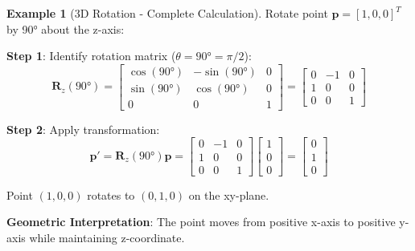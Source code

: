 \documentclass[12pt,a4paper]{article}
\theoremstyle{definition}
\newtheorem{example}{Example}[section]
\begin{document}
\begin{example}[3D Rotation - Complete Calculation]
Rotate point $\mathbf{p} = [1, 0, 0]^T$ by 90° about the z-axis:

\textbf{Step 1}: Identify rotation matrix ($\theta = 90° = \pi/2$):
\[
\mathbf{R}_z(90°) = \begin{bmatrix}
\cos(90°) & -\sin(90°) & 0 \\
\sin(90°) & \cos(90°) & 0 \\
0 & 0 & 1
\end{bmatrix}
= \begin{bmatrix}
0 & -1 & 0 \\
1 & 0 & 0 \\
0 & 0 & 1
\end{bmatrix}
\]

\textbf{Step 2}: Apply transformation:
\[
\mathbf{p}' = \mathbf{R}_z(90°)\mathbf{p} = \begin{bmatrix}
0 & -1 & 0 \\
1 & 0 & 0 \\
0 & 0 & 1
\end{bmatrix}
\begin{bmatrix}
1 \\ 0 \\ 0
\end{bmatrix}
= \begin{bmatrix}
0 \\ 1 \\ 0
\end{bmatrix}
\]

Point $(1, 0, 0)$ rotates to $(0, 1, 0)$ on the xy-plane.

\textbf{Geometric Interpretation}: The point moves from positive x-axis to positive y-axis while maintaining z-coordinate.
\end{example}
\end{document}

